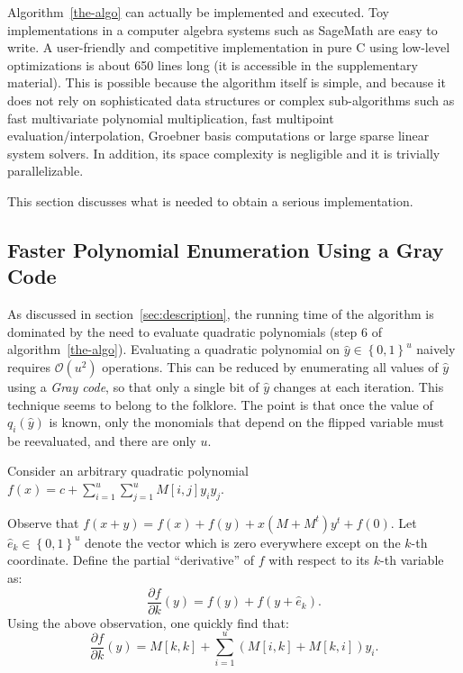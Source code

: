 \documentclass[a4paper,UKenglish,cleveref, autoref]{lipics-v2019}
\newcommand{\bits}{\left\{0, 1\right\}}
\newcommand{\bigO}[1]{\ensuremath{\mathcal{O}\left( #1 \right)} }
\begin{document}
Algorithm~\ref{the-algo} can actually be implemented and executed. Toy
implementations in a computer algebra systems such as \textsf{SageMath} are easy
to write. A user-friendly and competitive implementation in pure C using
low-level optimizations is about 650 lines long (it is accessible in the
supplementary material). This is possible because the algorithm itself is
simple, and because it does not rely on sophisticated data structures or complex
sub-algorithms such as fast multivariate polynomial multiplication, fast
multipoint evaluation/interpolation, Groebner basis computations or large sparse
linear system solvers. In addition, its space complexity is negligible and it is
trivially parallelizable.

This section discusses what is needed to obtain a serious implementation.

\subsection{Faster Polynomial Enumeration Using a Gray Code}
\label{sec:gray}

As discussed in section~\ref{sec:description}, the running time of the algorithm
is dominated by the need to evaluate quadratic polynomials (step 6 of
algorithm~\ref{the-algo}). Evaluating a quadratic polynomial on
$\hat y \in \bits^u$ naively requires $\bigO{u^2}$ operations. This can be
reduced by enumerating all values of $\hat y$ using a \emph{Gray code}, so that only a
single bit of $\hat y$ changes at each iteration. This technique seems to belong
to the folklore. The point is that once the value of $q_i(\hat y)$ is known,
only the monomials that depend on the flipped variable must be reevaluated, and
there are only $u$.

Consider an arbitrary quadratic polynomial $\displaystyle f(x) = c + \sum_{i=1}^u \sum_{j=1}^u M[i,j] y_i y_j$.

Observe that $f(x + y) = f(x) + f(y) + x \left(M + M^t\right)y^t + f(0)$. Let
$\hat e_k \in \bits^u$ denote the vector which is zero everywhere except on the
$k$-th coordinate.  Define the partial ``derivative'' of $f$ with respect to its
$k$-th variable as:
\[
\frac{\partial f}{\partial k}(y) = f(y) + f(y + \hat e_k).
\]
Using the above observation, one quickly find that:
\[
\frac{\partial f}{\partial k}(y) = M[k,k] + \sum_{i=1}^u (M[i,k] + M[k, i]) y_i.
\]
\end{document}
